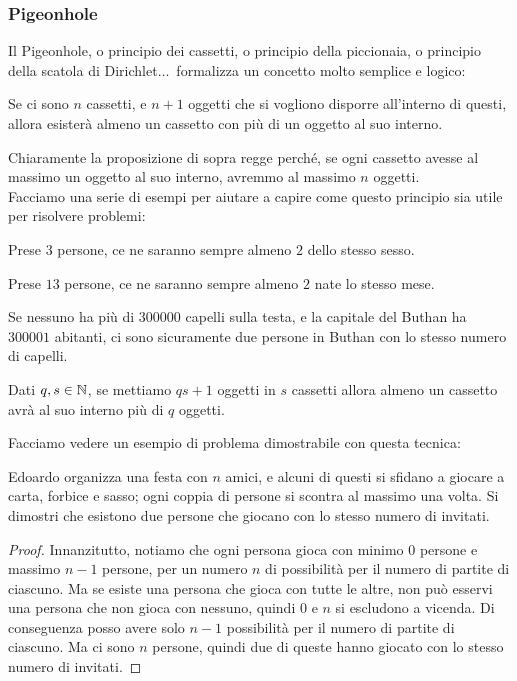 \documentclass[11pt]{scrartcl}
\begin{document}
	\subsubsection{Pigeonhole}
	Il Pigeonhole, o principio dei cassetti, o principio della piccionaia, o principio della scatola di Dirichlet$\dots\,$ formalizza un concetto molto semplice e logico: 
	\begin{proposition}[Pigeonhole]
		Se ci sono $n$ cassetti, e $n+1$ oggetti che si vogliono disporre all'interno di questi, allora esisterà almeno un cassetto con più di un oggetto al suo interno.
	\end{proposition}
	Chiaramente la proposizione di sopra regge perché, se ogni cassetto avesse al massimo un oggetto al suo interno, avremmo al massimo $n$ oggetti. \\
	Facciamo una serie di esempi per aiutare a capire come questo principio sia utile per risolvere problemi:
	\begin{example}
		Prese $3$ persone, ce ne saranno sempre almeno $2$ dello stesso sesso.
	\end{example}
	\begin{example}
		Prese $13$ persone, ce ne saranno sempre almeno $2$ nate lo stesso mese.
	\end{example}
	\begin{example}
		Se nessuno ha più di $300000$ capelli sulla testa, e la capitale del Buthan ha $300001$ abitanti, ci sono sicuramente due persone in Buthan con lo stesso numero di capelli.
	\end{example}
	\begin{example}
		Dati $q,s\in\mathbb N$, se mettiamo $qs+1$ oggetti in $s$ cassetti allora almeno un cassetto avrà al suo interno più di $q$ oggetti.
	\end{example}
	Facciamo vedere un esempio di problema dimostrabile con questa tecnica:
	\begin{exercise}
		Edoardo organizza una festa con $n$ amici, e alcuni di questi si sfidano a giocare a carta, forbice e sasso; ogni coppia di persone si scontra al massimo una volta. Si dimostri che esistono due persone che giocano con lo stesso numero di invitati.
	\end{exercise}
	\begin{proof}
		Innanzitutto, notiamo che ogni persona gioca con minimo $0$ persone e massimo $n-1$ persone, per un numero $n$ di possibilità per il numero di partite di ciascuno. Ma se esiste una persona che gioca con tutte le altre, non può esservi una persona che non gioca con nessuno, quindi $0$ e $n$ si escludono a vicenda. Di conseguenza posso avere solo $n-1$ possibilità per il numero di partite di ciascuno. Ma ci sono $n$ persone, quindi due di queste hanno giocato con lo stesso numero di invitati. 
	\end{proof}
	
\end{document}

